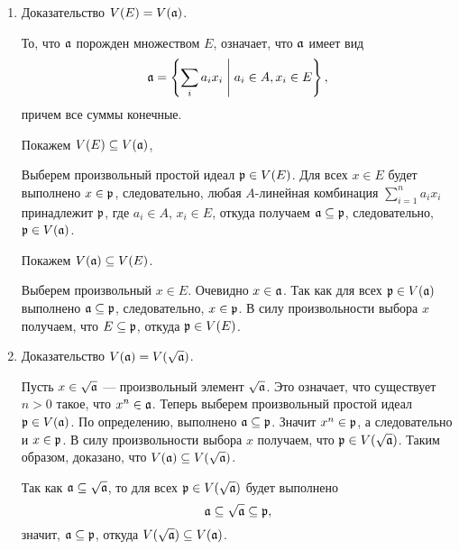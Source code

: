     \begin{Proof}
        \begin{enumerate}
            \item Доказательство $V(E) = V(\mathfrak{a})$.
            
                То, что $\mathfrak{a}$ порожден множеством $E$, означает, что $\mathfrak{a}$ имеет вид 
                $$
                    \mathfrak{a} = \left\{\sum_i a_ix_i \;\Bigg |\; a_i \in A, x_i \in E\right\},
                $$
                причем все суммы конечные.

                Покажем $V(E) \subseteq V(\mathfrak{a})$,

                Выберем произвольный простой идеал $\mathfrak{p} \in V(E)$. Для всех $x \in E$ будет выполнено $x \in \mathfrak{p}$, следовательно, любая $A$-линейная комбинация 
                $
                    \sum_{i = 1}^n a_ix_i
                $ 
                принадлежит $\mathfrak{p}$,
                где $a_i \in A$, $x_i \in E$, откуда получаем $\mathfrak{a} \subseteq \mathfrak{p}$, следовательно, $\mathfrak{p} \in V(\mathfrak{a})$.
        
                Покажем $V(\mathfrak{a}) \subseteq V(E)$.
        
                Выберем произвольный $x \in E$. Очевидно $x \in \mathfrak{a}$. Так как для всех $\mathfrak{p} \in V(\mathfrak{a})$ выполнено $\mathfrak{a} \subseteq \mathfrak{p}$, следовательно,
                $x \in \mathfrak{p}$. В силу произвольности выбора $x$ получаем, что $E \subseteq \mathfrak{p}$, откуда $\mathfrak{p} \in V(E)$.
            \item Доказательство $V(\mathfrak{a}) = V(\sqrt{\mathfrak{a}})$.

                Пусть $x \in \sqrt{\mathfrak{a}}$ --- произвольный элемент $\sqrt{\mathfrak{a}}$. Это означает, что существует $n > 0$ такое, что $x^n \in \mathfrak{a}$. 
                Теперь выберем произвольный простой идеал $\mathfrak{p} \in V(\mathfrak{a})$. По определению, выполнено $\mathfrak{a} \subseteq \mathfrak{p}$. Значит $x^n \in \mathfrak{p}$, а следовательно и
                $x \in \mathfrak{p}$. В силу произвольности выбора $x$ получаем, что $\mathfrak{p} \in V(\sqrt{\mathfrak{a}})$. Таким образом, доказано, что $V(\mathfrak{a}) \subseteq V(\sqrt{\mathfrak{a}})$. 
                
                Так как $\mathfrak{a} \subseteq \sqrt{\mathfrak{a}}$, то для всех $\mathfrak{p} \in V(\sqrt{\mathfrak{a}})$ будет выполнено 
                $$
                    \mathfrak{a} \subseteq \sqrt{\mathfrak{a}} \subseteq \mathfrak{p},
                $$
                значит, $\mathfrak{a} \subseteq \mathfrak{p}$, откуда $V(\sqrt{\mathfrak{a}}) \subseteq V(\mathfrak{a})$.
        \end{enumerate}
    \end{Proof}
